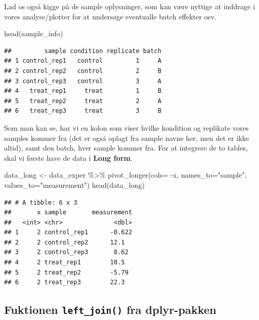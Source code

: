 \documentclass[
]{book}
\newenvironment{Shaded}{\begin{snugshade}}{\end{snugshade}}
\newcommand{\AttributeTok}[1]{\textcolor[rgb]{0.77,0.63,0.00}{#1}}
\newcommand{\FunctionTok}[1]{\textcolor[rgb]{0.00,0.00,0.00}{#1}}
\newcommand{\NormalTok}[1]{#1}
\newcommand{\OtherTok}[1]{\textcolor[rgb]{0.56,0.35,0.01}{#1}}
\newcommand{\SpecialCharTok}[1]{\textcolor[rgb]{0.00,0.00,0.00}{#1}}
\newcommand{\StringTok}[1]{\textcolor[rgb]{0.31,0.60,0.02}{#1}}
\begin{document}
Lad os også kigge på de sample oplysninger, som kan være nyttige at inddrage i vores analyse/plotter for at undersøge eventualle batch effekter osv.

\begin{Shaded}
\begin{Highlighting}[]
\FunctionTok{head}\NormalTok{(sample\_info)}
\end{Highlighting}
\end{Shaded}

\begin{verbatim}
##         sample condition replicate batch
## 1 control_rep1   control         1     A
## 2 control_rep2   control         2     B
## 3 control_rep3   control         3     A
## 4   treat_rep1     treat         1     B
## 5   treat_rep2     treat         2     A
## 6   treat_rep3     treat         3     B
\end{verbatim}

Som man kan se, har vi en kolon som viser hvilke kondition og replikate vores samples kommer fra (det er også oplagt fra sample navne her, men det er ikke altid), samt den batch, hver sample kommer fra. For at integrere de to tables, skal vi første have de data i \textbf{Long form}.

\begin{Shaded}
\begin{Highlighting}[]
\NormalTok{data\_long }\OtherTok{\textless{}{-}}\NormalTok{ data\_exper }\SpecialCharTok{\%\textgreater{}\%} \FunctionTok{pivot\_longer}\NormalTok{(}\AttributeTok{cols=} \SpecialCharTok{{-}}\NormalTok{x, }
                                        \AttributeTok{names\_to=}\StringTok{"sample"}\NormalTok{,}
                                        \AttributeTok{values\_to=}\StringTok{"measurement"}\NormalTok{)}
\FunctionTok{head}\NormalTok{(data\_long)}
\end{Highlighting}
\end{Shaded}

\begin{verbatim}
## # A tibble: 6 x 3
##       x sample       measurement
##   <int> <chr>              <dbl>
## 1     2 control_rep1      -0.622
## 2     2 control_rep2      12.1  
## 3     2 control_rep3       8.62 
## 4     2 treat_rep1        10.5  
## 5     2 treat_rep2        -5.79 
## 6     2 treat_rep3        22.3
\end{verbatim}

\hypertarget{fuktionen-left_join-fra-dplyr-pakken}{%
\subsection{\texorpdfstring{Fuktionen \texttt{left\_join()} fra dplyr-pakken}{Fuktionen left\_join() fra dplyr-pakken}}\label{fuktionen-left_join-fra-dplyr-pakken}}
\end{document}
